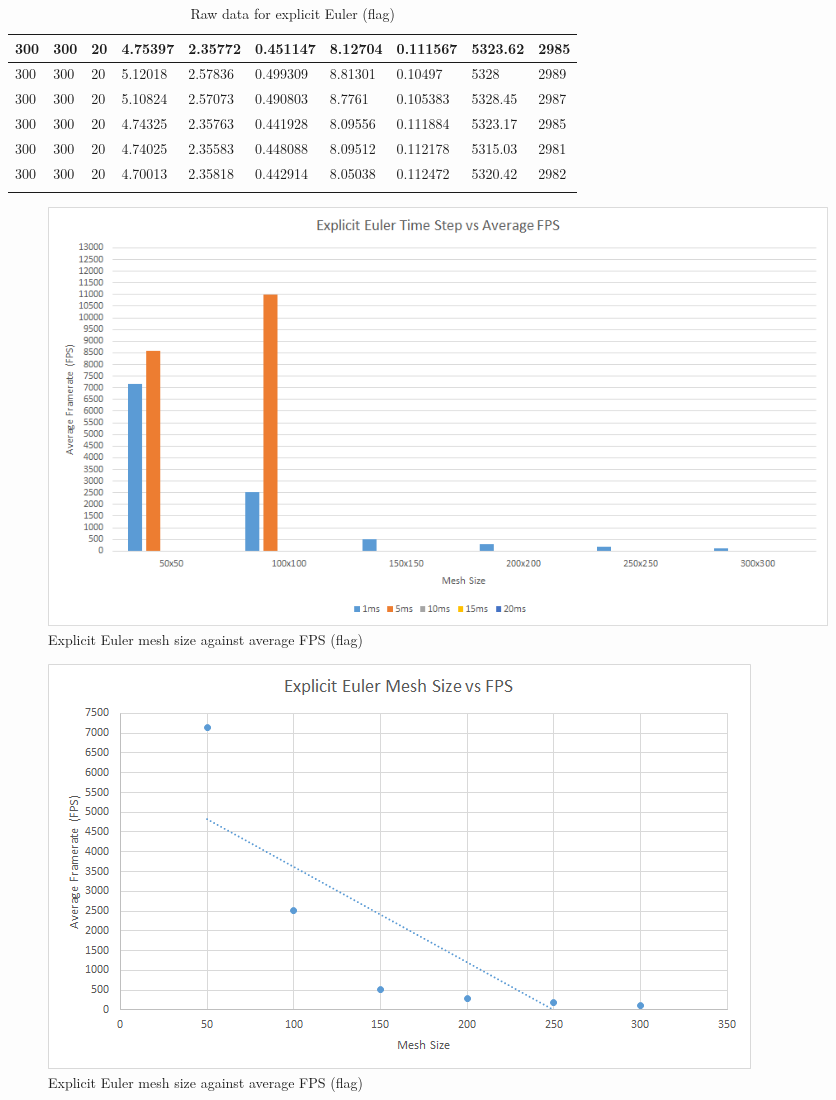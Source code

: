 \begin{landscape}
\begin{longtable}{ | l | l | l | l | l | l | l | l | l | l | }
300 & 300 & 20 & 4.75397 & 2.35772 & 0.451147 & 8.12704 & 0.111567 & 5323.62 & 2985\\ \hline
300 & 300 & 20 & 5.12018 & 2.57836 & 0.499309 & 8.81301 & 0.10497 & 5328 & 2989\\ \hline
300 & 300 & 20 & 5.10824 & 2.57073 & 0.490803 & 8.7761 & 0.105383 & 5328.45 & 2987\\ \hline
300 & 300 & 20 & 4.74325 & 2.35763 & 0.441928 & 8.09556 & 0.111884 & 5323.17 & 2985\\ \hline
300 & 300 & 20 & 4.74025 & 2.35583 & 0.448088 & 8.09512 & 0.112178 & 5315.03 & 2981\\ \hline
300 & 300 & 20 & 4.70013 & 2.35818 & 0.442914 & 8.05038 & 0.112472 & 5320.42 & 2982\\ \hline
   \caption{Raw data for explicit Euler (flag)}
   \label{tab:ee raw flag}
   \end{longtable}  

    \begin{figure}[!htb]
    \begin{center}
      \includegraphics[scale=0.95]{Figures/flag_ee_fps}
    \end{center}
    \caption{Explicit Euler mesh size against average FPS (flag)}
    \label{fig:ee fps flag}
  \end{figure}
\end{landscape}
  
    \begin{figure}
    \begin{center}
      \includegraphics[scale=.9]{Figures/flag_ee_m_fps}
    \end{center}
    \caption{Explicit Euler mesh size against average FPS (flag)}
    \label{fig:ee mesh fps flag}
  \end{figure}
  
